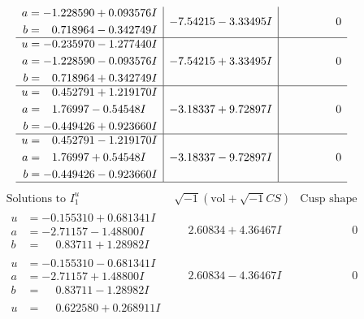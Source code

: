 \documentclass[1p]{elsarticle_modified}
\theoremstyle{definition}
\newcommand{\I}{\sqrt{-1}}
\begin{document}
$$\begin{array}{c|c|c}
\begin{aligned}
a &= -1.228590 + 0.093576 I \\
b &= \phantom{-}0.718964 - 0.342749 I\end{aligned}
 & -7.54215 - 3.33495 I & \phantom{-0.000000 } 0 \\ \hline\begin{aligned}
u &= -0.235970 - 1.277440 I \\
a &= -1.228590 - 0.093576 I \\
b &= \phantom{-}0.718964 + 0.342749 I\end{aligned}
 & -7.54215 + 3.33495 I & \phantom{-0.000000 } 0 \\ \hline\begin{aligned}
u &= \phantom{-}0.452791 + 1.219170 I \\
a &= \phantom{-}1.76997 - 0.54548 I \\
b &= -0.449426 + 0.923660 I\end{aligned}
 & -3.18337 + 9.72897 I & \phantom{-0.000000 } 0 \\ \hline\begin{aligned}
u &= \phantom{-}0.452791 - 1.219170 I \\
a &= \phantom{-}1.76997 + 0.54548 I \\
b &= -0.449426 - 0.923660 I\end{aligned}
 & -3.18337 - 9.72897 I & \phantom{-0.000000 } 0\\
 \hline 
 \end{array}$$\newpage$$\begin{array}{c|c|c}  
\text{Solutions to }I^u_{1}& \I (\text{vol} + \sqrt{-1}CS) & \text{Cusp shape}\\
 \hline 
\begin{aligned}
u &= -0.155310 + 0.681341 I \\
a &= -2.71157 - 1.48800 I \\
b &= \phantom{-}0.83711 + 1.28982 I\end{aligned}
 & \phantom{-}2.60834 + 4.36467 I & \phantom{-0.000000 } 0 \\ \hline\begin{aligned}
u &= -0.155310 - 0.681341 I \\
a &= -2.71157 + 1.48800 I \\
b &= \phantom{-}0.83711 - 1.28982 I\end{aligned}
 & \phantom{-}2.60834 - 4.36467 I & \phantom{-0.000000 } 0 \\ \hline\begin{aligned}
u &= \phantom{-}0.622580 + 0.268911 I \\

\end{aligned}
\end{array}$$
\end{document}
